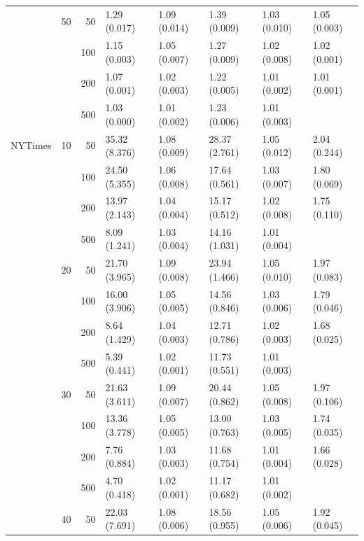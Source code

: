\begin{longtable}{p{}lrlllll}
      & 50  & 50  &   1.29 (0.017) &   1.09 (0.014) &   1.39 (0.009) &         1.03 (0.010) &  1.05 (0.003) \\
      &     & 100 &   1.15 (0.003) &   1.05 (0.007) &   1.27 (0.009) &         1.02 (0.008) &  1.02 (0.001) \\
      &     & 200 &   1.07 (0.001) &   1.02 (0.003) &   1.22 (0.005) &         1.01 (0.002) &  1.01 (0.001) \\
      &     & 500 &   1.03 (0.000) &   1.01 (0.002) &   1.23 (0.006) &         1.01 (0.003) &            \\
\midrule
NYTimes & 10  & 50  &  35.32 (8.376) &   1.08 (0.009) &  28.37 (2.761) &         1.05 (0.012) &  2.04 (0.244) \\
      &     & 100 &  24.50 (5.355) &   1.06 (0.008) &  17.64 (0.561) &         1.03 (0.007) &  1.80 (0.069) \\
      &     & 200 &  13.97 (2.143) &   1.04 (0.004) &  15.17 (0.512) &         1.02 (0.008) &  1.75 (0.110) \\
      &     & 500 &   8.09 (1.241) &   1.03 (0.004) &  14.16 (1.031) &         1.01 (0.004) &            \\
      & 20  & 50  &  21.70 (3.965) &   1.09 (0.008) &  23.94 (1.466) &         1.05 (0.010) &  1.97 (0.083) \\
      &     & 100 &  16.00 (3.906) &   1.05 (0.005) &  14.56 (0.846) &         1.03 (0.006) &  1.79 (0.046) \\
      &     & 200 &   8.64 (1.429) &   1.04 (0.003) &  12.71 (0.786) &         1.02 (0.003) &  1.68 (0.025) \\
      &     & 500 &   5.39 (0.441) &   1.02 (0.001) &  11.73 (0.551) &         1.01 (0.003) &            \\
      & 30  & 50  &  21.63 (3.611) &   1.09 (0.007) &  20.44 (0.862) &         1.05 (0.008) &  1.97 (0.106) \\
      &     & 100 &  13.36 (3.778) &   1.05 (0.005) &  13.00 (0.763) &         1.03 (0.005) &  1.74 (0.035) \\
      &     & 200 &   7.76 (0.884) &   1.03 (0.003) &  11.68 (0.754) &         1.01 (0.004) &  1.66 (0.028) \\
      &     & 500 &   4.70 (0.418) &   1.02 (0.001) &  11.17 (0.682) &         1.01 (0.002) &            \\
      & 40  & 50  &  22.03 (7.691) &   1.08 (0.006) &  18.56 (0.955) &         1.05 (0.006) &  1.92 (0.045) \\

\end{longtable}
